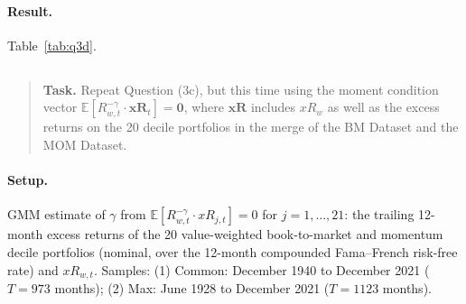 \documentclass[11pt]{article}
\newcommand{\task}[1]{\begin{quote}\small\textbf{Task.} #1\end{quote}}
\begin{document}
\paragraph{Result.}
Table~\ref{tab:q3d}.

\begin{table}[htbp]
  \centering
  
  \caption{Two-step GMM estimate of $\gamma$ from the moment conditions of Question~\ref{q3c};
    $\hat{\mathbf{W}} = \hat{\mathbf{S}}_1^{-1}$ in step 2 and
    $\hat{\mathbf{A}} = \hat{\mathbf{G}}'\hat{\mathbf{S}}_1^{-1}$ in the sandwich. Sample: December 1940 to
    December 2021 ($T = 973$ months), identical in versions (1) Common and (2) Max. Data: monthly observations of 12-month (annual) real returns from the
    EQ Dataset. Units: decimals. Standard error next to the estimate and $t$-statistics: Newey--West (1987,
    1994), Bartlett kernel, Newey--West (1994) automatic lag rounded down, re-selected for $\hat{\mathbf{S}}_1$
    and $\hat{\mathbf{S}}_2$ (selected lags in the table). $\chi^2$: test that the two pricing errors are
    jointly zero (Moore--Penrose pseudo-inverse).}
  \label{tab:q3d}
\end{table}

\FloatBarrier
\subsection{}\label{q3e}
\task{Repeat Question (3c), but this time using the moment condition vector $\mathbb{E}[R_{w,t}^{-\gamma} \cdot \mathbf{xR}_t] = \mathbf{0}$, where $\mathbf{xR}$ includes $xR_w$ as well as the excess returns on the 20 decile portfolios in the merge of the BM Dataset and the MOM Dataset.}
\paragraph{Setup.}
GMM estimate of $\gamma$ from $\mathbb{E}[R_{w,t}^{-\gamma} \cdot xR_{j,t}] = 0$ for $j = 1, \dots, 21$:
the trailing 12-month excess returns of the 20 value-weighted book-to-market and momentum decile portfolios
(nominal, over the 12-month compounded Fama--French risk-free rate) and $xR_{w,t}$. Samples: (1) Common: December 1940 to December 2021 ($T = 973$ months); (2) Max: June 1928 to December 2021 ($T = 1123$ months).
\end{document}

